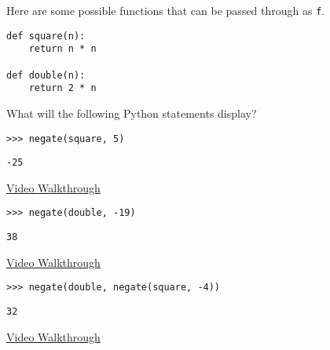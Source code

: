 \begin{blocksection}
\question Here are some possible functions that can be passed through as
\lstinline$f$.

\begin{lstlisting}
def square(n):
    return n * n

def double(n):
    return 2 * n
\end{lstlisting}

What will the following Python statements display?

\begin{lstlisting}
>>> negate(square, 5)
\end{lstlisting}
\begin{solution}[0.2in]
\begin{lstlisting}
-25
\end{lstlisting}
\href{https://www.youtube.com/watch?v=q3sZ3lX25eI&list=PLx38hZJ5RLZfg6jvEBBtjc5fnc5BclyEb&index=4}{Video Walkthrough}
\end{solution}

\begin{lstlisting}
>>> negate(double, -19)
\end{lstlisting}
\begin{solution}[0.2in]
\begin{lstlisting}
38
\end{lstlisting}
\href{https://youtu.be/q3sZ3lX25eI?t=3m13s}{Video Walkthrough}
\end{solution}

\begin{lstlisting}
>>> negate(double, negate(square, -4))
\end{lstlisting}
\begin{solution}[0.3in]
\begin{lstlisting}
32
\end{lstlisting}
\href{https://youtu.be/q3sZ3lX25eI?t=5m49s}{Video Walkthrough}
\end{solution}
\end{blocksection}
